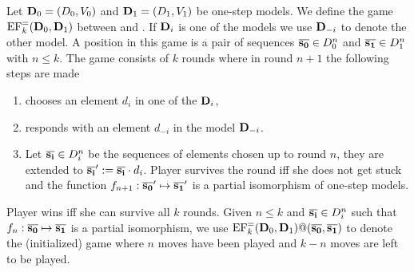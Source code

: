 \begin{definition}
	Let $\mathbf{D}_0 = (D_0,V_0)$ and $\mathbf{D}_1 = (D_1,V_1)$ be one-step models. We define the game $\mathrm{EF}^=_k(\mathbf{D}_0,\mathbf{D}_1)$ between \abelard and \eloise. If $\mathbf{D}_i$ is one of the models we use $\mathbf{D}_{-i}$ to denote the other model. A position in this game is a pair of sequences $\overline{{\mathbf{s_0}}} \in D_0^n$ and $\overline{{\mathbf{s_1}}} \in D_1^n$ with $n \leq k$. The game consists of $k$ rounds where in round $n+1$ the following steps are made
	\begin{enumerate}[1.]
		 pt
		 pt
		\item \abelard chooses an element $d_i$ in one of the $\mathbf{D}_i$,
		\item \eloise responds with an element $d_{-i}$ in the model $\mathbf{D}_{-i}$.
		\item Let $\overline{{\mathbf{s_i}}} \in D_i^n$ be the sequences of elements chosen up to round $n$, they are extended to ${\overline{{\mathbf{s_i}}}' := \overline{{\mathbf{s_i}}}\cdot d_i}$. Player \eloise survives the round iff she does not get stuck and the function $f_{n+1}: \overline{{\mathbf{s_0}}}' \mapsto \overline{{\mathbf{s_1}}}'$ is a partial isomorphism of one-step models.
	\end{enumerate}
	Player \eloise wins iff she can survive all $k$ rounds.
	Given $n\leq k$ and $\overline{{\mathbf{s_i}}} \in D_i^n$ such that $f_n:\overline{{\mathbf{s_0}}}\mapsto\overline{{\mathbf{s_1}}}$ is a partial isomorphism, we use $\mathrm{EF}_{k}^=(\mathbf{D}_0,\mathbf{D}_1)@(\overline{{\mathbf{s_0}}},\overline{{\mathbf{s_1}}})$ to denote the (initialized) game where $n$ moves have been played and $k-n$ moves are left to be played.
\end{definition}


